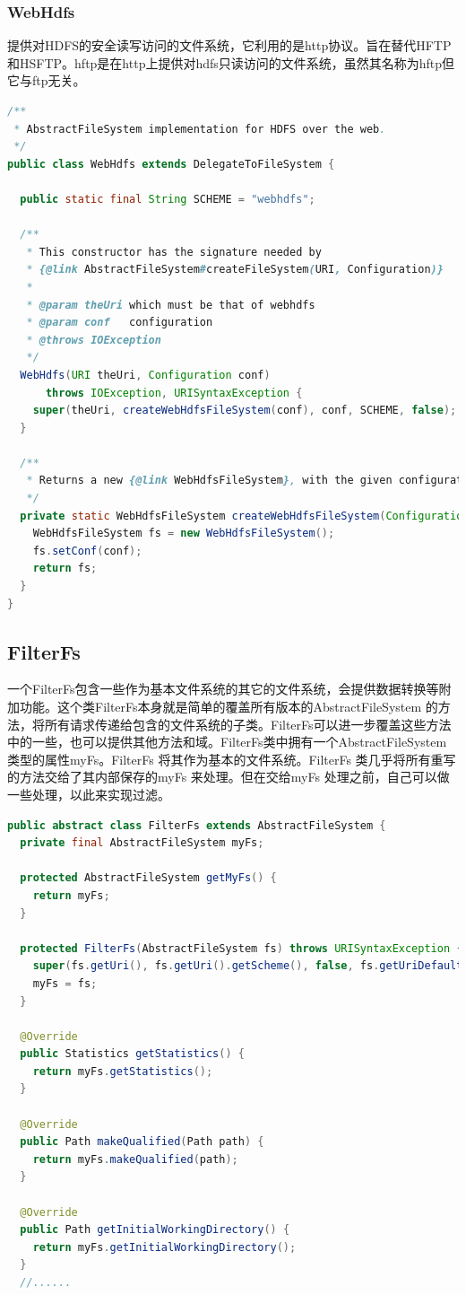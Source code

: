 \subsubsection{WebHdfs}
提供对HDFS的安全读写访问的文件系统，它利用的是http协议。旨在替代HFTP和HSFTP。hftp是在http上提供对hdfs只读访问的文件系统，虽然其名称为hftp但它与ftp无关。
\begin{lstlisting}[language=Java]
/**
 * AbstractFileSystem implementation for HDFS over the web.
 */
public class WebHdfs extends DelegateToFileSystem {

  public static final String SCHEME = "webhdfs";

  /**
   * This constructor has the signature needed by
   * {@link AbstractFileSystem#createFileSystem(URI, Configuration)}
   *
   * @param theUri which must be that of webhdfs
   * @param conf   configuration
   * @throws IOException
   */
  WebHdfs(URI theUri, Configuration conf)
      throws IOException, URISyntaxException {
    super(theUri, createWebHdfsFileSystem(conf), conf, SCHEME, false);
  }

  /**
   * Returns a new {@link WebHdfsFileSystem}, with the given configuration.
   */
  private static WebHdfsFileSystem createWebHdfsFileSystem(Configuration conf) {
    WebHdfsFileSystem fs = new WebHdfsFileSystem();
    fs.setConf(conf);
    return fs;
  }
}
\end{lstlisting}


\subsection{FilterFs}
一个FilterFs包含一些作为基本文件系统的其它的文件系统，会提供数据转换等附加功能。这个类FilterFs本身就是简单的覆盖所有版本的AbstractFileSystem 的方法，将所有请求传递给包含的文件系统的子类。FilterFs可以进一步覆盖这些方法中的一些，也可以提供其他方法和域。FilterFs类中拥有一个AbstractFileSystem类型的属性myFs。FilterFs 将其作为基本的文件系统。FilterFs 类几乎将所有重写的方法交给了其内部保存的myFs 来处理。但在交给myFs 处理之前，自己可以做一些处理，以此来实现过滤。
\begin{lstlisting}[language=Java]
public abstract class FilterFs extends AbstractFileSystem {
  private final AbstractFileSystem myFs;

  protected AbstractFileSystem getMyFs() {
    return myFs;
  }

  protected FilterFs(AbstractFileSystem fs) throws URISyntaxException {
    super(fs.getUri(), fs.getUri().getScheme(), false, fs.getUriDefaultPort());
    myFs = fs;
  }

  @Override
  public Statistics getStatistics() {
    return myFs.getStatistics();
  }

  @Override
  public Path makeQualified(Path path) {
    return myFs.makeQualified(path);
  }

  @Override
  public Path getInitialWorkingDirectory() {
    return myFs.getInitialWorkingDirectory();
  }
  //......
\end{lstlisting}


